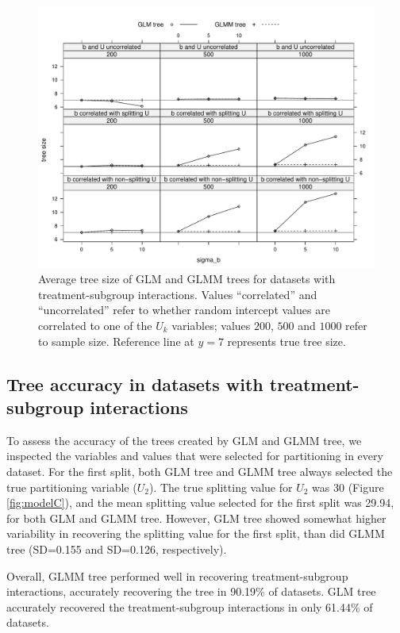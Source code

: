 \documentclass[nobf,doc]{apa}
\begin{document}
\begin{figure}[!htbp]
	\includegraphics[width=12cm]{xy_treesizes_treatsubs.pdf}
	\caption{Average tree size of GLM and GLMM trees for datasets with treatment-subgroup interactions. Values ``correlated'' and ``uncorrelated'' refer to whether random intercept values are correlated to one of the $U_k$ variables; values $200$, $500$ and $1000$ refer to sample size. Reference line at $y=7$ represents true tree size.}
	\label{fig:xyplot_treesize_interact}
\end{figure}
	


 
\subsection{Tree accuracy in datasets with treatment-subgroup interactions}

To assess the accuracy of the trees created by GLM and GLMM tree, we inspected the variables and values that were selected for partitioning in every dataset. For the first split, both GLM tree and GLMM tree always selected the true partitioning variable ($U_2$). The true splitting value for $U_2$ was 30 (Figure \ref{fig:modelC}), and the mean splitting value selected for the first split was 29.94, for both GLM and GLMM tree. However, GLM tree showed somewhat higher variability in recovering the splitting value for the first split, than did GLMM tree (SD=0.155 and SD=0.126, respectively).

Overall, GLMM tree performed well in recovering treatment-subgroup interactions, accurately recovering the tree in 90.19\% of datasets. GLM tree accurately recovered the treatment-subgroup interactions in only 61.44\% of datasets. 
\end{document}

